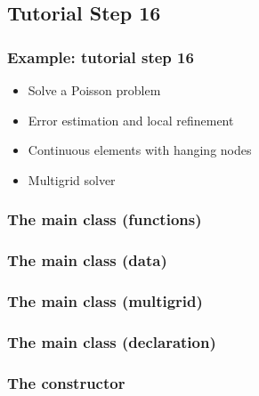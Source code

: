 
\lstset{language=C++,
  basicstyle=\scriptsize,%
  keywordstyle=\bfseries,
  showtabs=false,
  showspaces=false,
  tabsize=2}

\subsection{Tutorial Step 16}
\begin{frame}
  \frametitle{Example: tutorial step 16}
  \begin{itemize}
  \item Solve a Poisson problem
  \item Error estimation and local refinement
  \item Continuous elements with hanging nodes
  \item Multigrid solver
  \end{itemize}
\end{frame}

\begin{frame}
  \frametitle{The main class (functions)}
  
\end{frame}

\begin{frame}
  \frametitle{The main class (data)}
  
\end{frame}

\begin{frame}
  \frametitle{The main class (multigrid)}
  
\end{frame}

\begin{frame}
  \frametitle{The main class (declaration)}
  
\end{frame}

\begin{frame}
  \frametitle{The constructor}
  
\end{frame}

